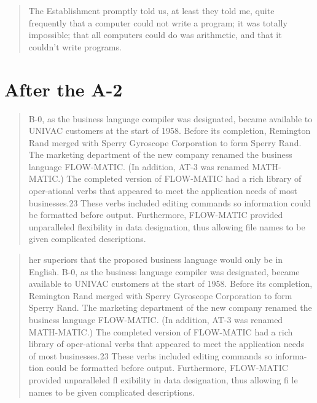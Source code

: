 \begin{quotation}
The Establishment promptly told us, at least they told me, quite frequently that a
computer could not write a program; it was totally impossible; that all computers
could do was arithmetic, and that it couldn't write programs.\cite{hopl_keynote}
\end{quotation}


\section{After the A-2}


\begin{quotation}
B-0, as the business language compiler was designated, became available to 
UNIVAC customers at the start of 1958. Before its completion, Remington Rand 
merged with Sperry Gyroscope Corporation to form Sperry Rand. The marketing 
department of the new company renamed the business language FLOW-MATIC. (In 
addition, AT-3 was renamed MATH-MATIC.) The completed version of FLOW-MATIC had 
a rich library of oper-ational verbs that appeared to meet the application 
needs of most businesses.23 These verbs included editing commands so 
information could be formatted before output. Furthermore, FLOW-MATIC provided 
unparalleled flexibility in data designation, thus allowing file names to be 
given complicated descriptions.
\end{quotation}

\begin{quotation}
her superiors that the proposed business language would only be in English.  
B-0, as the business language compiler was designated, became available to 
UNIVAC customers at the start of 1958. Before its completion, Remington Rand 
merged with Sperry Gyroscope Corporation to form Sperry Rand. The marketing 
department of the new company renamed the business language FLOW-MATIC. (In 
addition, AT-3 was renamed MATH-MATIC.) The completed version of FLOW-MATIC had 
a rich library of oper-ational verbs that appeared to meet the application 
needs of most businesses.23 These verbs included editing commands so 
informa-tion could be formatted before output. Furthermore, FLOW-MATIC provided 
unparalleled fl exibility in data designation, thus allowing fi le names to be 
given complicated descriptions.
\end{quotation}

